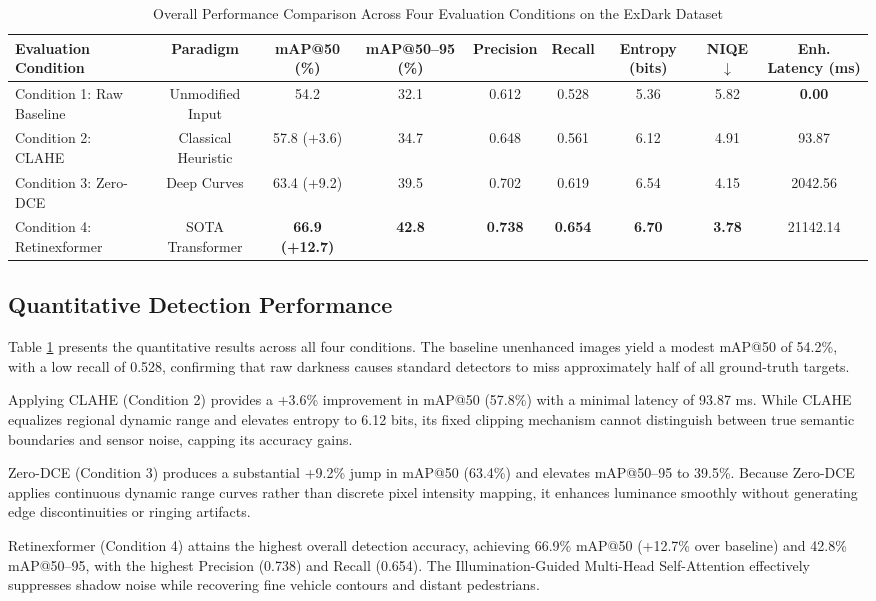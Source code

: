 \documentclass[conference]{IEEEtran}
\begin{document}
\begin{table}[t]
\centering
\caption{Overall Performance Comparison Across Four Evaluation Conditions on the ExDark Dataset}
\label{tab:overall_results}
\begin{tabular}{lcccccccc}
\toprule
\textbf{Evaluation Condition} & \textbf{Paradigm} & \textbf{mAP@50 (\%)} & \textbf{mAP@50--95 (\%)} & \textbf{Precision} & \textbf{Recall} & \textbf{Entropy (bits)} & \textbf{NIQE $\downarrow$} & \textbf{Enh. Latency (ms)} \\
\midrule
Condition 1: Raw Baseline & Unmodified Input & 54.2 & 32.1 & 0.612 & 0.528 & 5.36 & 5.82 & \textbf{0.00} \\
Condition 2: CLAHE & Classical Heuristic & 57.8 (+3.6) & 34.7 & 0.648 & 0.561 & 6.12 & 4.91 & 93.87 \\
Condition 3: Zero-DCE & Deep Curves & 63.4 (+9.2) & 39.5 & 0.702 & 0.619 & 6.54 & 4.15 & 2042.56 \\
Condition 4: Retinexformer & SOTA Transformer & \textbf{66.9 (+12.7)} & \textbf{42.8} & \textbf{0.738} & \textbf{0.654} & \textbf{6.70} & \textbf{3.78} & 21142.14 \\
\bottomrule
\end{tabular}
\end{table}

\subsection{Quantitative Detection Performance}
Table \ref{tab:overall_results} presents the quantitative results across all four conditions. The baseline unenhanced images yield a modest mAP@50 of 54.2\%, with a low recall of 0.528, confirming that raw darkness causes standard detectors to miss approximately half of all ground-truth targets.

Applying CLAHE (Condition 2) provides a +3.6\% improvement in mAP@50 (57.8\%) with a minimal latency of 93.87 ms. While CLAHE equalizes regional dynamic range and elevates entropy to 6.12 bits, its fixed clipping mechanism cannot distinguish between true semantic boundaries and sensor noise, capping its accuracy gains.

Zero-DCE (Condition 3) produces a substantial +9.2\% jump in mAP@50 (63.4\%) and elevates mAP@50--95 to 39.5\%. Because Zero-DCE applies continuous dynamic range curves rather than discrete pixel intensity mapping, it enhances luminance smoothly without generating edge discontinuities or ringing artifacts.

Retinexformer (Condition 4) attains the highest overall detection accuracy, achieving 66.9\% mAP@50 (+12.7\% over baseline) and 42.8\% mAP@50--95, with the highest Precision (0.738) and Recall (0.654). The Illumination-Guided Multi-Head Self-Attention effectively suppresses shadow noise while recovering fine vehicle contours and distant pedestrians.
\end{document}
